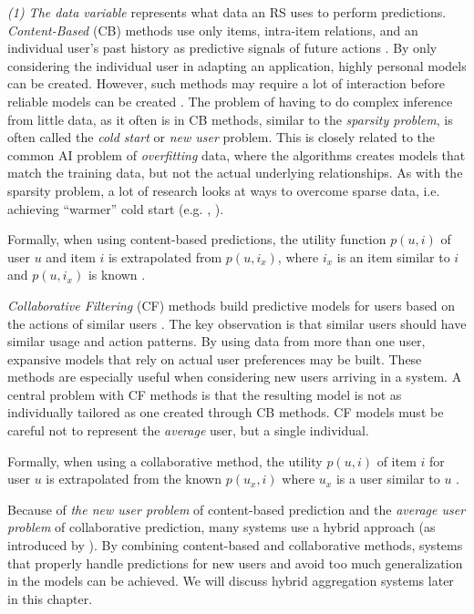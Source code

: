 \emph{(1) The data variable} represents what data an RS uses to perform predictions. 
\emph{Content-Based} (CB) methods use only items, intra-item relations, and 
an individual user's past history as predictive signals of future actions \cite[p.1]{Pazzani2007}.
By only considering the individual user in adapting an application, highly personal models can be created. 
However, such methods may require a lot of interaction before reliable models can be created \cite[p.4]{Adomavicius2005}.
The problem of having to do complex inference from little data, as it often is in CB methods,
similar to the \emph{sparsity problem}, is often called the \emph{cold start} or \emph{new user} problem. 
This is closely related to the common AI problem of \emph{overfitting} data, 
where the algorithms creates models that match the training data, 
but not the actual underlying relationships. 
As with the sparsity problem, a lot of research looks at ways to overcome sparse data, i.e. achieving ``warmer'' cold start
(e.g. \cite{Said2009}, \cite{Lilegraven2011}). 

Formally, when using content-based predictions, the utility function $p(u,i)$ of user $u$ and item $i$ is extrapolated from $p(u,i_x)$, 
where $i_x$ is an item similar to $i$ and $p(u,i_x)$ is known \cite[p.2]{Adomavicius2005}.

\emph{Collaborative Filtering} (CF) methods build predictive models for users based on the actions of similar users \citep{Schafer2007}.
The key observation is that similar users should have similar usage and action patterns. 
By using data from more than one user, expansive models that rely on actual user preferences may be built. 
These methods are especially useful when considering new users arriving in a system. 
A central problem with CF methods is that the resulting model is not as individually tailored as one created through CB methods. 
CF models must be careful not to represent the \emph{average} user, but a single individual.

Formally, when using a collaborative method, 
the utility $p(u,i)$ of item $i$ for user $u$ is extrapolated from the known $p(u_x,i)$ where $u_x$ is a user similar to $u$
\cite[p.4]{Adomavicius2005}. 

Because of \emph{the new user problem} of content-based prediction and the \emph{average user problem} of collaborative prediction, 
many systems use a hybrid approach (as introduced by \cite{Burke2007}).
By combining content-based and collaborative methods, 
systems that properly handle predictions for new users and avoid too much generalization in the models can be achieved. 
We will discuss hybrid aggregation systems later in this chapter.

